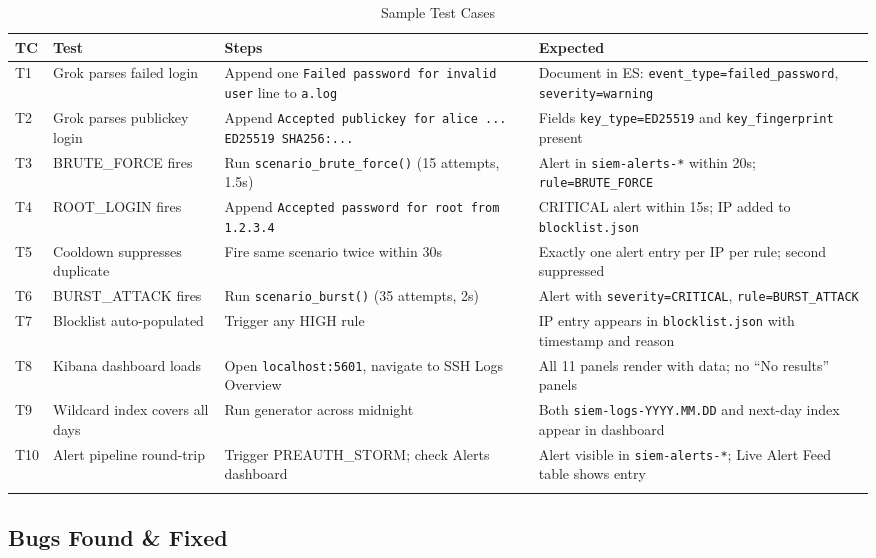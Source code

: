 \documentclass[12pt,a4paper]{article}
\newcommand{\file}[1]{\texttt{\color{accent}#1}}
\newcommand{\field}[1]{\texttt{#1}}
\begin{document}
\begin{longtable}{p{0.6cm}p{4cm}p{5cm}p{4cm}}
  \toprule
  \textbf{TC} & \textbf{Test} & \textbf{Steps} & \textbf{Expected} \\
  \midrule\endhead
  T1 & Grok parses failed login &
    Append one \texttt{Failed password for invalid user} line to \file{a.log} &
    Document in ES: \field{event\_type=failed\_password}, \field{severity=warning} \\
  \midrule
  T2 & Grok parses publickey login &
    Append \texttt{Accepted publickey for alice ... ED25519 SHA256:...} &
    Fields \field{key\_type=ED25519} and \field{key\_fingerprint} present \\
  \midrule
  T3 & BRUTE\_FORCE fires &
    Run \texttt{scenario\_brute\_force()} (15 attempts, 1.5s) &
    Alert in \field{siem-alerts-*} within 20s; \field{rule=BRUTE\_FORCE} \\
  \midrule
  T4 & ROOT\_LOGIN fires &
    Append \texttt{Accepted password for root from 1.2.3.4} &
    CRITICAL alert within 15s; IP added to \file{blocklist.json} \\
  \midrule
  T5 & Cooldown suppresses duplicate &
    Fire same scenario twice within 30s &
    Exactly one alert entry per IP per rule; second suppressed \\
  \midrule
  T6 & BURST\_ATTACK fires &
    Run \texttt{scenario\_burst()} (35 attempts, 2s) &
    Alert with \field{severity=CRITICAL}, \field{rule=BURST\_ATTACK} \\
  \midrule
  T7 & Blocklist auto-populated &
    Trigger any HIGH rule &
    IP entry appears in \file{blocklist.json} with timestamp and reason \\
  \midrule
  T8 & Kibana dashboard loads &
    Open \texttt{localhost:5601}, navigate to SSH Logs Overview &
    All 11 panels render with data; no ``No results'' panels \\
  \midrule
  T9 & Wildcard index covers all days &
    Run generator across midnight &
    Both \field{siem-logs-YYYY.MM.DD} and next-day index appear in dashboard \\
  \midrule
  T10 & Alert pipeline round-trip &
    Trigger PREAUTH\_STORM; check Alerts dashboard &
    Alert visible in \field{siem-alerts-*}; Live Alert Feed table shows entry \\
  \bottomrule
  \caption{Sample Test Cases}
\end{longtable}

\subsection{Bugs Found \& Fixed}
\end{document}
